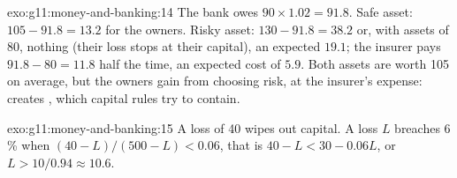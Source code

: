 \begin{solution}{exo:g11:money-and-banking:14}
The bank owes $90 \times 1.02 = 91.8$. Safe asset: $105 - 91.8 = 13.2$ for the owners. Risky asset: $130 - 91.8 = 38.2$ or, with assets of 80, nothing (their loss stops
at their capital), an expected $19.1$; the insurer pays $91.8 - 80 = 11.8$ half the time, an expected cost of $5.9$. Both assets are worth 105 on average, but the owners
gain from choosing risk, at the insurer's expense:  creates , which capital rules try to contain.
\end{solution}

\begin{solution}{exo:g11:money-and-banking:15}
A loss of 40 wipes out capital. A loss $L$ breaches 6\,\% when $(40 - L)/(500 - L) < 0.06$, that is $40 - L < 30 - 0.06L$, or $L > 10/0.94 \approx 10.6$.
\end{solution}

